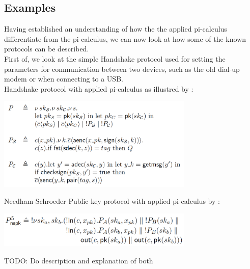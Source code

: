\subsection{Examples}
Having established an understanding of how the the applied pi-calculus differentiate from the pi-calculus, we can now look at how some of the known protocols can be described.\\
First of, we look at the simple Handshake protocol used for setting the parameters for communication between two devices, such as the old dial-up modem or when connecting to a USB.  \\
Handshake protocol with applied pi-calculus as illustred by \citeauthor{AplliedPiCalsulus2010}:
\begin{center}
\includegraphics[width=0.7\textwidth, angle=0]{Handshake.pdf}
\end{center}
Needham-Schroeder Public key protocol with applied pi-calculus by \citeauthor{DBLP:journals/ftpl/CortierK14,}:
\begin{center}
\includegraphics[width=0.7\textwidth, angle=0]{Needham_Schroeder.pdf}
\end{center}
TODO: Do description and explanation of both 

